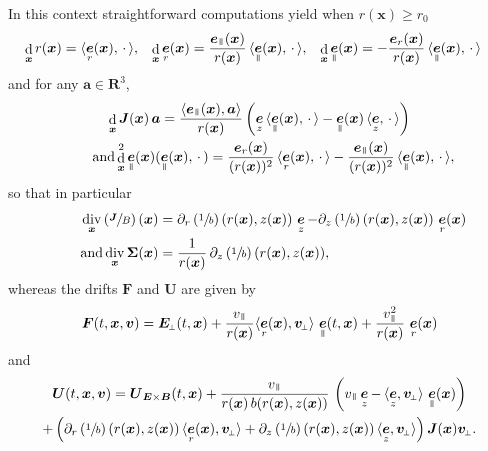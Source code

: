\documentclass[JEP,XML,SOM,Unicode]{cedram}
\newcommand{\sperp}{{\scriptscriptstyle\perp}}
\let\d\partial
\DeclareMathOperator\dD{d}\let\dd\dD
\DeclareMathOperator{\Div}{div}
\theoremstyle{plain}
\theoremstyle{definition}
\newcommand\R{\mathbf R}
\newcommand\bB{{\boldsymbol B}}
\newcommand\bE{{\boldsymbol E}}
\newcommand\bF{{\boldsymbol F}}
\newcommand\bJ{{\boldsymbol J}}
\newcommand\bU{{\boldsymbol U}}
\let\bfF\bF
\let\bfU\bU
\newcommand\bfa{{\boldsymbol a}}
\newcommand\bfv{{\boldsymbol v}}
\newcommand\bfx{{\boldsymbol x}}
\newcommand\Sig{{\boldsymbol \Sigma}}
\DeclareMathOperator{\beD}{\boldsymbol{e}}
\newcommand\eDr{\beD_r}
\newcommand\eDz{\beD_z}
\newcommand\eDpar{\beD_\mypar}
\newcommand\vpar{v_\mypar}
\newcommand\bvperp{\bfv_{\!\sperp}}
\newcommand\Eperp{\bE_{\!\sperp}}
\newcommand{\EcB}{\bU_{\bE\times\bB}}
\newcommand{\mypar}{{\mkern3mu\vphantom{\perp}\vrule depth 0pt\mkern2mu\vrule depth 0pt\mkern3mu}}
\begin{document}
In this context straightforward computations yield when $r(\bfx)\geq r_0$
\begin{align*}
\dD_\bfx r(\bfx)&=\langle\eDr(\bfx),\,\cdot\,\rangle,&
\dD_\bfx \eDr(\bfx)&=\frac{\eDpar(\bfx)}{r(\bfx)}\,\langle\eDpar(\bfx),\,\cdot\,\rangle,&
\dD_\bfx \eDpar(\bfx)&=-\frac{\eDr(\bfx)}{r(\bfx)}\,\langle\eDpar(\bfx),\,\cdot\,\rangle
\end{align*}
and for any $\bfa\in\R^3$,
\begin{gather*}
\dD_\bfx\bJ(\bfx)\,\bfa
=\frac{\langle\eDpar(\bfx),\bfa\rangle}{r(\bfx)}
\left(\eDz\,\langle\eDpar(\bfx),\,\cdot\,\rangle
-\eDpar(\bfx)\,\langle\eDz,\,\cdot\,\rangle\right)
\\
\tag*{and}
\dD_\bfx^2\eDpar(\bfx)(\eDpar(\bfx),\,\cdot\,)
=\frac{\eDr(\bfx)}{(r(\bfx))^2}\,\langle\eDr(\bfx),\,\cdot\,\rangle
-\frac{\eDpar(\bfx)}{(r(\bfx))^2}\,\langle\eDpar(\bfx),\,\cdot\,\rangle,
\end{gather*}
so that in particular
\begin{align*}
\Div_{\bfx}\left(\sfrac{\bJ}{B}\right)(\bfx) &=\d_r\left(\sfrac1b\right)(r(\bfx),z(\bfx))\,\eDz
-\d_z\left(\sfrac1b\right)(r(\bfx),z(\bfx))\,\eDr(\bfx)
\\
\tag*{and}
\Div_\bfx\Sig(\bfx)
&=\frac{1}{r(\bfx)}\,\d_z\left(\sfrac1b\right)(r(\bfx),z(\bfx)),
\end{align*}
whereas the drifts $\bfF$ and $\bfU$ are given by
\[
\bF(t,\bfx,\bfv) = \Eperp(t,\bfx)
+\frac{\vpar}{r(\bfx)}\langle \eDr(\bfx),\bvperp\rangle\,\eDpar(t,\bfx)
+\frac{\vpar^2}{r(\bfx)}\,\eDr(\bfx)
\]
and
\begin{multline*}
\bU(t,\bfx,\bfv)
= \EcB(t,\bfx)
+\frac{\vpar}{r(\bfx)\,b(r(\bfx),z(\bfx))}\,\left(\vpar\eDz
-
\,\langle\eDz,\bvperp\rangle\,\eDpar(\bfx)\right)
\\
+\left(\d_r\left(\sfrac1b\right)(r(\bfx),z(\bfx))\,\langle\eDr(\bfx),\bvperp\rangle
+\d_z\left(\sfrac1b\right)(r(\bfx),z(\bfx))\,\langle\eDz,\bvperp\rangle\right)\bJ(\bfx)\bvperp.
\end{multline*}
\end{document}
